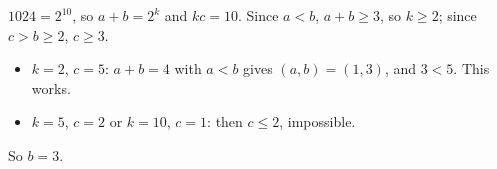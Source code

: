 $1024=2^{10}$, so $a+b=2^k$ and $kc=10$. Since $a<b$, $a+b\ge3$, so $k\ge2$; since $c>b\ge2$, $c\ge3$.
\begin{itemize}
\item $k=2$, $c=5$: $a+b=4$ with $a<b$ gives $(a,b)=(1,3)$, and $3<5$. This works.
\item $k=5$, $c=2$ or $k=10$, $c=1$: then $c\le2$, impossible.
\end{itemize}
So $b=\boxed{3}$.
